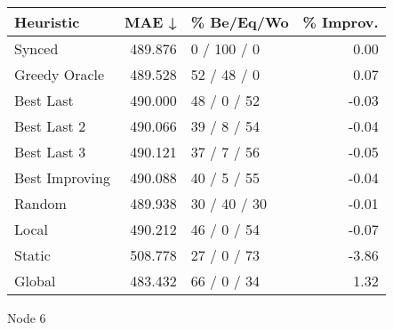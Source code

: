 \begin{tabular}{lrlr}
\toprule
\textbf{Heuristic} & \textbf{MAE ↓} & \textbf{\% Be/Eq/Wo} & \textbf{\% Improv.} \\
\midrule
            Synced &        489.876 &          0 / 100 / 0 &                0.00 \\
     Greedy Oracle &        489.528 &          52 / 48 / 0 &                0.07 \\
         Best Last &        490.000 &          48 / 0 / 52 &               -0.03 \\
       Best Last 2 &        490.066 &          39 / 8 / 54 &               -0.04 \\
       Best Last 3 &        490.121 &          37 / 7 / 56 &               -0.05 \\
    Best Improving &        490.088 &          40 / 5 / 55 &               -0.04 \\
            Random &        489.938 &         30 / 40 / 30 &               -0.01 \\
             Local &        490.212 &          46 / 0 / 54 &               -0.07 \\
            Static &        508.778 &          27 / 0 / 73 &               -3.86 \\
            Global &        483.432 &          66 / 0 / 34 &                1.32 \\
\bottomrule
\end{tabular}
\caption{Node 6}
\label{tab:iid_lr01_le1_bs4_6}
